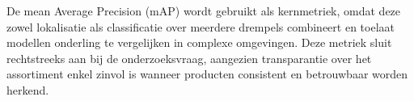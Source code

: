 \documentclass[dutch,dit,thesis]{hogentreport}
\begin{document}
De mean Average Precision (mAP) wordt gebruikt als kernmetriek, omdat deze zowel lokalisatie als classificatie over meerdere drempels combineert en toelaat modellen onderling te vergelijken in complexe omgevingen. Deze metriek sluit rechtstreeks aan bij de onderzoeksvraag, aangezien transparantie over het assortiment enkel zinvol is wanneer producten consistent en betrouwbaar worden herkend.



%


\backmatter{}

\setlength\bibitemsep{2pt} %
\printbibliography[heading=bibintoc]
\end{document}
